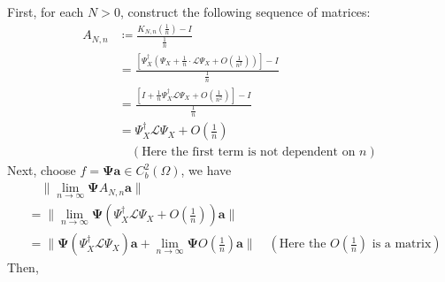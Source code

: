 \documentclass{article}[11]
\begin{document}
	
	First, for each $N>0$, construct the following sequence of matrices:
	\begin{align*}
		A_{N,n} &\coloneqq \frac{ K_{N,n}\left( \tfrac{1}{n} \right)  - I }{\tfrac{1}{n}} \\
		&= \frac{ \left[\Psi_X^{\dagger}\left(\Psi_X + \tfrac{1}{n} \cdot \mathcal{L}\Psi_X + O(\tfrac{1}{n^2})\right)\right]  - I }{\tfrac{1}{n}} \\
		&= \frac{ \left[I + \tfrac{1}{n}\Psi_X^{\dagger}\mathcal{L}\Psi_X + O(\tfrac{1}{n^2})\right]  - I }{\tfrac{1}{n}} \\
		&= \Psi_X^{\dagger}\mathcal{L}\Psi_X + O(\tfrac{1}{n}) \\
		&\quad (\text{Here the first term is not dependent on $n$})
	\end{align*}
	Next, choose $f = \mathbf{\Psi}\mathbf{a} \in C_b^2(\Omega)$, we have
	\begin{align*}
		&\quad \|\lim_{n\to\infty} \mathbf{\Psi}A_{N,n}\mathbf{a}\| \\
		&= \|\lim_{n\to\infty} \mathbf{\Psi}\left(\Psi_X^{\dagger}\mathcal{L}\Psi_X + O(\tfrac{1}{n})\right)\mathbf{a}\| \\
		&= \|\mathbf{\Psi}\left(\Psi_X^{\dagger}\mathcal{L}\Psi_X\right)\mathbf{a} + \lim_{n\to\infty} \mathbf{\Psi}O(\tfrac{1}{n})\mathbf{a}\| \quad (\text{Here the $O(\tfrac{1}{n})$ is a matrix})
	\end{align*}
	Then,
\end{document}
